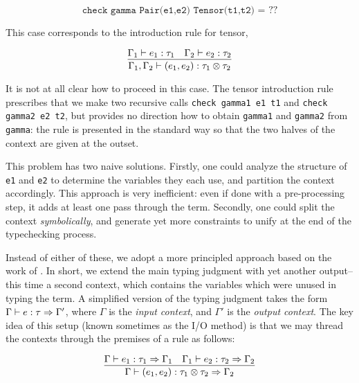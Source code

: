 $$
\texttt{check gamma Pair(e1,e2) Tensor(t1,t2) = } ??
$$

This case corresponds to the introduction rule for tensor,

$$
\infer{\Gamma_1,\Gamma_2 \vdash (e_1,e_2) : \tau_1 \otimes \tau_2}{\Gamma_1 \vdash e_1 : \tau_1 & \Gamma_2 \vdash e_2 : \tau_2}
$$


It is not at all clear how to proceed in this case. The tensor introduction rule prescribes that we make two recursive calls \texttt{check gamma1 e1 t1} and \texttt{check gamma2 e2 t2}, but provides no direction how to obtain \texttt{gamma1} and \texttt{gamma2} from \texttt{gamma}: the rule is presented in the standard way so that the two halves of the context are given at the outset.

This problem has two naive solutions. Firstly, one could analyze the structure of \texttt{e1} and \texttt{e2} to determine the variables they each use, and partition the context accordingly. This approach is very inefficient: even if done with a pre-processing step, it adds at least one pass through the term. Secondly, one could split the context \textit{symbolically}, and generate yet more constraints to unify at the end of the typechecking process.

Instead of either of these, we adopt a more principled approach based on the work of \citet{cervesato:tcs00}. In short, we extend the main typing judgment with yet another output-- this time a second context, which contains the variables which were unused in typing the term. A simplified version of the typing judgment takes the form $\Gamma \vdash e : \tau \Rightarrow \Gamma'$, where $\Gamma$ is the \textit{input context}, and $\Gamma'$ is the \textit{output context}. The key idea of this setup (known sometimes as the I/O method) is that we may thread the contexts through the premises of a rule as follows:

$$
\infer{\Gamma \vdash (e_1,e_2) : \tau_1 \otimes \tau_2 \gens \Gamma_2}{\Gamma \vdash e_1 : \tau_1 \gens \Gamma_1 & \Gamma_1 \vdash e_2 : \tau_2 \gens \Gamma_2}
$$

